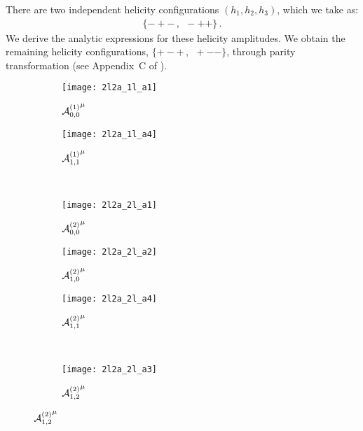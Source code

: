 \documentclass[main.tex]{subfiles}
\begin{document}
There are two independent helicity configurations $(h_1,h_2,h_3)$, which we take as:
\begin{align} \label{eqQED:helconfs}
    \{-+- \,, \ \ -++\} \,.
\end{align}
We derive the analytic expressions for these helicity amplitudes.
We obtain the remaining helicity configurations, $\{+-+ \,,\ \ +--\}$, through parity transformation (see Appendix~C of ).

\begin{figure}
    \begin{center}
        \begin{subfigure}[c]{0.3\linewidth}
            \centering
            \texttt{[image: 2l2a\_1l\_a1]}
            \caption{${\mathcal{A}^{(1)}_{0, 0}}^{\mu}$}
            \label{fig:1Lbox}
        \end{subfigure}
        \begin{subfigure}[c]{0.3\linewidth}
            \centering
            \vspace{4ex}
            \texttt{[image: 2l2a\_1l\_a4]}
            \vspace{4ex}
            \caption{${\mathcal{A}^{(1)}_{1, 1}}^{\mu}$}
            \label{fig:1Lbubble}
        \end{subfigure}
        \\
        \vspace{1em}
        \begin{subfigure}[c]{0.3\linewidth}
            \centering
            \texttt{[image: 2l2a\_2l\_a1]}
            \caption{${\mathcal{A}^{(2)}_{0, 0}}^{\mu}$}
            \label{fig:2Lbox1}
        \end{subfigure}
        \begin{subfigure}[c]{0.3\linewidth}
            \centering
            \texttt{[image: 2l2a\_2l\_a2]}
            \caption{${\mathcal{A}^{(2)}_{1, 0}}^{\mu}$}
            \label{fig:2Lboxbubble1}
        \end{subfigure}
        \begin{subfigure}[c]{0.3\linewidth}
            \centering
            \texttt{[image: 2l2a\_2l\_a4]}
            \caption{${\mathcal{A}^{(2)}_{1, 1}}^{\mu}$}
            \label{fig:2Lboxbubble2}
        \end{subfigure}
        \\
        \vspace{1em}
        \begin{subfigure}[c]{0.3\linewidth}
            \centering
            \texttt{[image: 2l2a\_2l\_a3]}
            \caption{${\mathcal{A}^{(2)}_{1, 2}}^{\mu}$}

\end{subfigure}
\end{center}
\end{figure}
\end{document}
